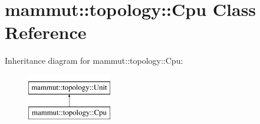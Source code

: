 \hypertarget{classmammut_1_1topology_1_1Cpu}{\section{mammut\-:\-:topology\-:\-:Cpu Class Reference}
\label{classmammut_1_1topology_1_1Cpu}
}
Inheritance diagram for mammut\-:\-:topology\-:\-:Cpu\-:\begin{figure}[H]
\begin{center}
\leavevmode
\includegraphics[height=2.000000cm]{classmammut_1_1topology_1_1Cpu}
\end{center}
\end{figure}
